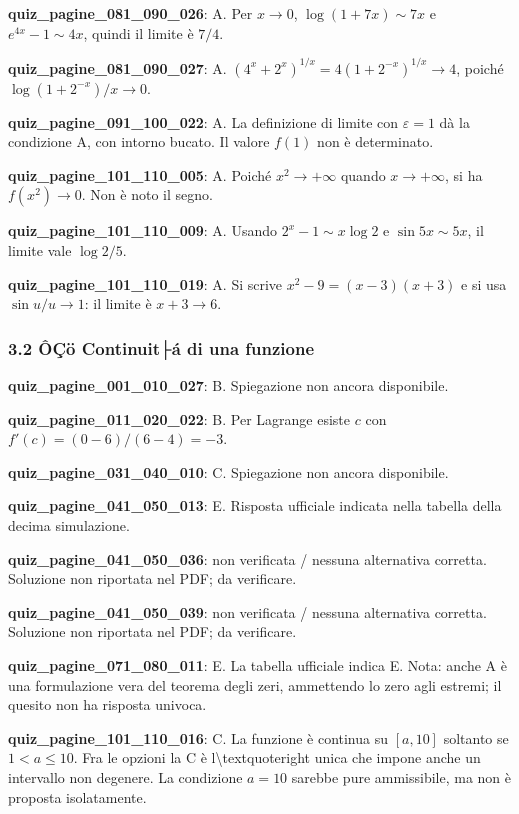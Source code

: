 \documentclass[11pt,a4paper]{article}
\newcounter{quiz}
\begin{document}
\noindent\textbf{quiz\_pagine\_081\_090\_026}: A. Per $x\to0$, $\log(1+7x)\sim7x$ e $e^{4x}-1\sim4x$, quindi il limite è $7/4$.\par\medskip
\noindent\textbf{quiz\_pagine\_081\_090\_027}: A. $(4^x+2^x)^{1/x}=4(1+2^{-x})^{1/x}\to4$, poiché $\log(1+2^{-x})/x\to0$.\par\medskip
\noindent\textbf{quiz\_pagine\_091\_100\_022}: A. La definizione di limite con $\varepsilon=1$ dà la condizione A, con intorno bucato. Il valore $f(1)$ non è determinato.\par\medskip
\noindent\textbf{quiz\_pagine\_101\_110\_005}: A. Poiché $x^2\to+\infty$ quando $x\to+\infty$, si ha $f(x^2)\to0$. Non è noto il segno.\par\medskip
\noindent\textbf{quiz\_pagine\_101\_110\_009}: A. Usando $2^x-1\sim x\log2$ e $\sin5x\sim5x$, il limite vale $\log2/5$.\par\medskip
\noindent\textbf{quiz\_pagine\_101\_110\_019}: A. Si scrive $x^2-9=(x-3)(x+3)$ e si usa $\sin u/u\to1$: il limite è $x+3\to6$.\par\medskip
\subsubsection*{3.2 ÔÇö Continuit├á di una funzione}
\noindent\textbf{quiz\_pagine\_001\_010\_027}: B. Spiegazione non ancora disponibile.\par\medskip
\noindent\textbf{quiz\_pagine\_011\_020\_022}: B. Per Lagrange esiste $c$ con $f\prime(c)=(0-6)/(6-4)=-3$.\par\medskip
\noindent\textbf{quiz\_pagine\_031\_040\_010}: C. Spiegazione non ancora disponibile.\par\medskip
\noindent\textbf{quiz\_pagine\_041\_050\_013}: E. Risposta ufficiale indicata nella tabella della decima simulazione.\par\medskip
\noindent\textbf{quiz\_pagine\_041\_050\_036}: non verificata / nessuna alternativa corretta. Soluzione non riportata nel PDF; da verificare.\par\medskip
\noindent\textbf{quiz\_pagine\_041\_050\_039}: non verificata / nessuna alternativa corretta. Soluzione non riportata nel PDF; da verificare.\par\medskip
\noindent\textbf{quiz\_pagine\_071\_080\_011}: E. La tabella ufficiale indica E. Nota: anche A è una formulazione vera del teorema degli zeri, ammettendo lo zero agli estremi; il quesito non ha risposta univoca.\par\medskip
\noindent\textbf{quiz\_pagine\_101\_110\_016}: C. La funzione è continua su $[a,10]$ soltanto se $1<a\leq10$. Fra le opzioni la C è l\textbackslash{}textquoteright unica che impone anche un intervallo non degenere. La condizione $a=10$ sarebbe pure ammissibile, ma non è proposta isolatamente.\par\medskip
\end{document}

